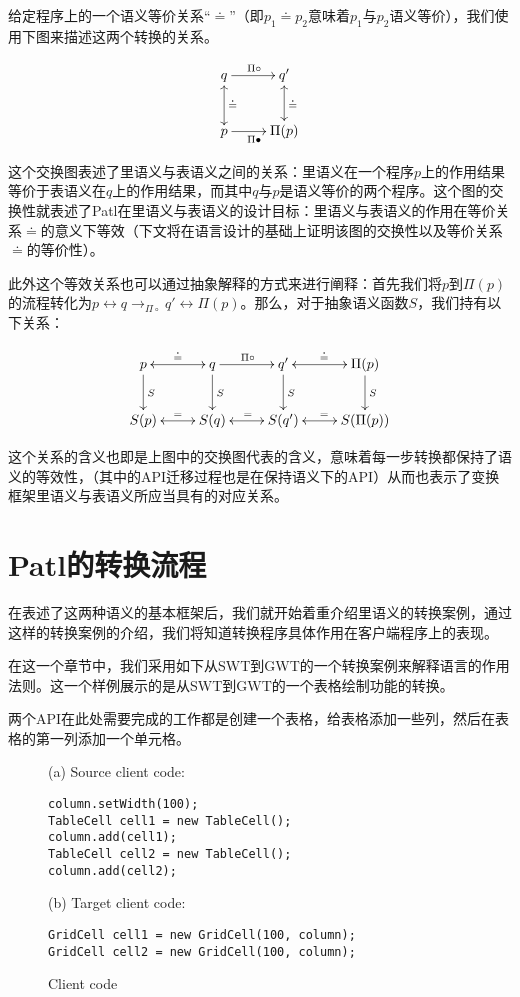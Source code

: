 给定程序上的一个语义等价关系“$\doteq$”（即$p_1\doteq p_2$意味着$p_1$与$p_2$语义等价），我们使用下图来描述这两个转换的关系。

\begin{equation}\label{eqn:diagram}
  \xymatrix{
    q \ar[r]^{\Pi\circ}  & q' \ar@{<->}[d]^{
    \doteq} \\
     p \ar[r]_{\Pi\bullet} \ar@{<->}[u]_\doteq       & \Pi(p) }
\end{equation}

这个交换图表述了里语义与表语义之间的关系：里语义在一个程序$p$上的作用结果等价于表语义在$q$上的作用结果，而其中$q$与$p$是语义等价的两个程序。这个图的交换性就表述了Patl在里语义与表语义的设计目标：里语义与表语义的作用在等价关系$\doteq$的意义下等效（下文将在语言设计的基础上证明该图的交换性以及等价关系$\doteq$的等价性）。

此外这个等效关系也可以通过抽象解释的方式来进行阐释：首先我们将$p$到$\Pi(p)$的流程转化为$p\leftrightarrow q \rightarrow_{\Pi\circ}q'\leftrightarrow \Pi(p)$。那么，对于抽象语义函数$S$，我们持有以下关系：

\begin{displaymath}
  \xymatrix{
    p \ar@{<->}[r]^\doteq \ar[d]^S & q \ar[r]^{\Pi\circ}  \ar[d]^S & q' \ar@{<->}[r]^{
      \doteq} \ar[d]^S & \Pi(p) \ar[d]^S\\
    S(p) \ar@{<->}[r]^= & S(q) \ar@{<->}[r]^= & S(q') \ar@{<->}[r]^= & S(\Pi(p))}
\end{displaymath}

这个关系的含义也即是上图中的交换图代表的含义，意味着每一步转换都保持了语义的等效性，（其中的API迁移过程也是在保持语义下的API）从而也表示了变换框架里语义与表语义所应当具有的对应关系。

\section{Patl的转换流程}
在表述了这两种语义的基本框架后，我们就开始着重介绍里语义的转换案例，通过这样的转换案例的介绍，我们将知道转换程序具体作用在客户端程序上的表现。

在这一个章节中，我们采用如下从SWT到GWT的一个转换案例来解释语言的作用法则。这一个样例展示的是从SWT到GWT的一个表格绘制功能的转换。

两个API在此处需要完成的工作都是创建一个表格，给表格添加一些列，然后在表格的第一列添加一个单元格。

\begin{figure}[ht]
  {\small (a) Source client code:}
\begin{lstlisting}[style=java]
column.setWidth(100);
TableCell cell1 = new TableCell();
column.add(cell1);
TableCell cell2 = new TableCell();
column.add(cell2);
\end{lstlisting}

  {\small (b) Target client code:}
\begin{lstlisting}[style=java]
GridCell cell1 = new GridCell(100, column);
GridCell cell2 = new GridCell(100, column);
\end{lstlisting}

\caption{Client code}
\label{fig:client}
\end{figure}


